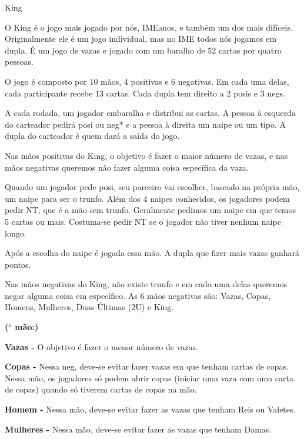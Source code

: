 \begin{subsecao}{King}

O King é o jogo mais jogado por nós, IMEanos, e também um dos mais difíceis.
Originalmente ele é um jogo individual, mas no IME todos nós jogamos em
dupla. É um jogo de vazas e jogado com um baralho de 52 cartas por quatro
pessoas.

O jogo é composto por 10 mãos, 4 positivas e 6 negativas. Em cada uma delas,
cada participante recebe 13 cartas. Cada dupla tem direito a 2 posis e 3 negs.

A cada rodada, um jogador embaralha e distribui as cartas. A pessoa à esquerda
do carteador pedirá posi ou neg* e a pessoa à direita um naipe ou um tipo. A
dupla do carteador é quem dará a saída do jogo.

Nas mãos positivas do King, o objetivo é fazer o maior número de vazas, e nas
mãos negativas queremos não fazer alguma coisa específica da vaza.

Quando um jogador pede posi, seu parceiro vai escolher, baseado na própria
mão, um naipe para ser o trunfo. Além dos 4 naipes conhecidos, os jogadores
podem pedir NT, que é a mão sem trunfo. Geralmente pedimos um naipe em que
temos 5 cartas ou mais. Costuma-se pedir NT se o jogador não tiver nenhum
naipe longo.

Após a escolha do naipe é jogada essa mão. A dupla que fizer mais vazas
ganhará pontos.

Nas mãos negativas do King, não existe trunfo e em cada uma delas queremos
negar alguma coisa em específico. As 6 mãos negativas são: Vazas, Copas,
Homens, Mulheres, Duas Últimas (2U) e King.


\begin{list}{\textbf{ ($^{o}$ mão:)}}{}

\item \textbf{Vazas -} O objetivo é fazer o menor número de vazas.

\item \textbf{Copas -}  Nessa neg, deve-se evitar fazer vazas em que tenham
cartas de copas. Nessa mão, os jogadores só podem abrir copas (iniciar uma
vaza com uma carta de copas) quando só tiverem cartas de copas na mão.

\item \textbf{Homem -} Nessa mão, deve-se evitar fazer as vazas que tenham
Reis ou Valetes.

\item \textbf{Mulheres -} Nessa mão, deve-se evitar fazer as vazas que
tenham Damas.


\end{list}
\end{subsecao}
